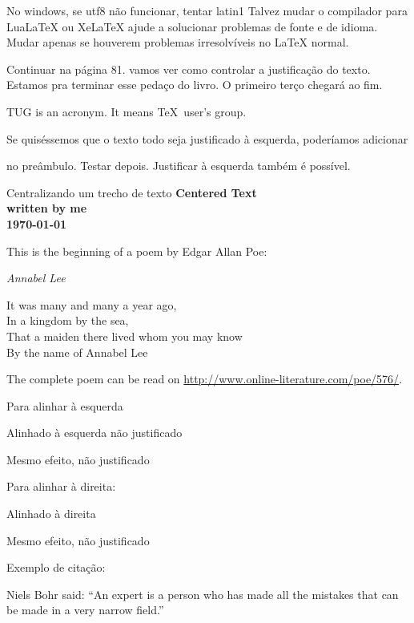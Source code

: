 \documentclass{article}
\begin{document}
No windows, se utf8 não funcionar, tentar latin1
Talvez mudar o compilador para LuaLaTeX ou XeLaTeX ajude a solucionar
problemas de fonte e de idioma.
Mudar apenas se houverem problemas irresolvíveis no LaTeX normal.

Continuar na página 81. vamos ver como controlar a justificação do texto.
Estamos pra terminar esse pedaço do livro. O primeiro terço chegará ao fim.

\parbox{3cm}{\raggedright
    TUG is an acronym. It means \TeX\ user's group.
}
Se quiséssemos que o texto todo seja justificado à esquerda, poderíamos
adicionar \raggedright no preâmbulo. 
Testar depois.
Justificar à esquerda também é possível.

Centralizando um trecho de texto
{\centering
\huge\bfseries Centered Text \\
\Large \normalfont written by me \\
\normalsize \today \\
}


\noindent This is the beginning of a poem
by Edgar Allan Poe:
\begin{center}
    \emph{Annabel Lee}
\end{center}
\begin{center}
    It was many and many a year ago,\\
    In a kingdom by the sea,\\
    That a maiden there lived whom you may know\\
    By the name of Annabel Lee
\end{center}

The complete poem can be read on
\url{http://www.online-literature.com/poe/576/}.

Para alinhar à esquerda
\begin{flushleft}
Alinhado à esquerda não justificado
\end{flushleft}
{\raggedright
Mesmo efeito, não justificado
}

Para alinhar à direita:
\begin{flushright}
    Alinhado à direita
\end{flushright}
{\raggedleft
Mesmo efeito, não justificado
}

Exemplo de citação:

Niels Bohr said: ``An expert is a person who has made
all the mistakes that can be made in a very narrow field.''
\end{document}
